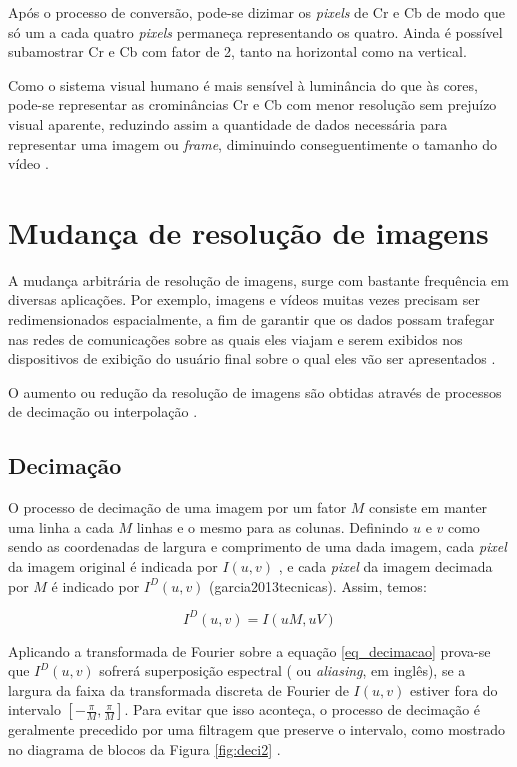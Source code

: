 \noindent Após o processo de conversão, pode-se dizimar os \textit{pixels} de Cr e Cb de modo que só um a cada quatro \textit{pixels} permaneça representando os quatro. Ainda é possível subamostrar Cr e Cb com fator de 2, tanto na horizontal como na vertical.

Como o sistema visual humano é mais sensível à luminância do que às cores, pode-se representar as crominâncias Cr e Cb com menor resolução sem prejuízo visual aparente, reduzindo assim a quantidade de dados necessária para representar uma imagem ou \textit{frame}, diminuindo conseguentimente o tamanho do vídeo \cite{itu16601}.

\section{Mudança de resolução de imagens}



A mudança arbitrária de resolução de imagens, surge com bastante frequência em diversas aplicações. Por exemplo, imagens e vídeos muitas vezes precisam ser redimensionados espacialmente, a fim de garantir que os dados possam trafegar nas redes de comunicações sobre as quais eles viajam e serem exibidos nos dispositivos de exibição do usuário final sobre o qual eles vão ser apresentados \cite{salazar2007complexity}.

O aumento ou redução da resolução de imagens são obtidas através de processos de decimação ou interpolação \cite{diniz2010digital}. 

\subsection{Decimação}

O processo de decimação de uma imagem por um fator $M$ consiste em manter uma linha a cada $M$ linhas e o mesmo para as colunas. Definindo $u$ e $v$ como sendo as coordenadas de largura e comprimento de uma dada imagem, cada \textit{pixel} da imagem original é indicada por $I(u,v)$ , e cada \textit{pixel} da imagem decimada por $M$ é indicado por $I^D(u,v)$  (garcia2013tecnicas). Assim, temos:

\begin{equation}
I^D(u,v) = I(uM,uV) 
\label{eq_decimacao}
\end{equation}

Aplicando a transformada de Fourier sobre a equação \ref{eq_decimacao} prova-se que $I^D(u,v)$ sofrerá superposição espectral ( ou \textit{aliasing}, em inglês), se a largura da faixa da transformada discreta de Fourier  de $I(u,v)$ estiver fora do intervalo $\left[-\frac{\pi}{M},\frac{\pi}{M} \right]$. Para evitar que isso aconteça, o processo de decimação é geralmente precedido por uma filtragem que preserve o intervalo, como mostrado no diagrama de blocos da Figura \ref{fig:deci2} \cite{garcia2013tecnicas} . \\

